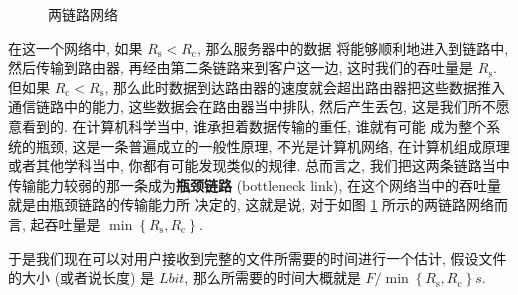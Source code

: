 \documentclass[10pt,UTF8]{book} %
\begin{document}
\begin{example}
\begin{figure}[H]
        \caption{两链路网络}
        \label{两链路网络}
    \end{figure}
    在这一个网络中, 如果 $R_\mathrm{s} < R_\mathrm{c}$, 那么服务器中的数据
    将能够顺利地进入到链路中, 然后传输到路由器, 再经由第二条链路来到客户这一边,
    这时我们的吞吐量是 $R_\mathrm{s}$. 但如果 $R_\mathrm{c} < R_\mathrm{s}$,
    那么此时数据到达路由器的速度就会超出路由器把这些数据推入通信链路中的能力,
    这些数据会在路由器当中排队, 然后产生丢包, 这是我们所不愿意看到的.
    在计算机科学当中, {\kaishu 谁承担着数据传输的重任, 谁就有可能
    成为整个系统的瓶颈}, 这是一条普遍成立的一般性原理, 不光是计算机网络,
    在计算机组成原理或者其他学科当中, 你都有可能发现类似的规律.
    总而言之, 我们把这两条链路当中传输能力较弱的那一条成为\textbf{瓶颈链路}
    (bottleneck link), 在这个网络当中的吞吐量就是由瓶颈链路的传输能力所
    决定的, 这就是说, 对于如图 \ref{两链路网络} 所示的两链路网络而言,
    起吞吐量是 $\min \left\{ R_\mathrm{s}, R_\mathrm{c} \right\}$.
    
    于是我们现在可以对用户接收到完整的文件所需要的时间进行一个估计, 假设文件的大小
    (或者说长度) 是 $L \si{bit}$, 那么所需要的时间大概就是 $F/\min \left\{
        R_\mathrm{s}, R_\mathrm{c}
    \right\} \si{s}$.


\end{example}
\end{document}
